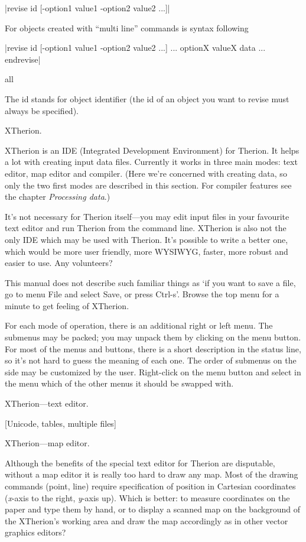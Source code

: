   |revise id [-option1 value1 -option2 value2 ...]|
  
  For objects created with ``multi line'' commands is syntax following

|revise id [-option1 value1 -option2 value2 ...]
  ...
  optionX valueX
  data
  ...
endrevise|
\endsyntax

\context
  all
\endcontext

\arguments
  The id stands for object identifier (the id of an object you want to
  revise must always be specified).
\endarguments




\subchapter XTherion.

XTherion is an IDE (Integrated Development Environment) for Therion. 
It helps a lot with creating input data files. Currently it works in 
three main modes: text editor, map editor and compiler. (Here we're concerned 
with creating data, so only the two first modes are described in this section. For compiler 
features see the chapter {\it Processing data}.)

It's not necessary for Therion itself---you may edit input files in your 
favourite text editor and run Therion from the command line. XTherion is also 
not the only IDE which may be used with Therion. It's possible to 
write a better one, which would be more user friendly, more WYSIWYG, faster, 
more robust and easier to use. Any volunteers?

This manual does not describe such familiar things as `if you want to save a file, go to 
menu File and select Save, or press Ctrl-s'. Browse the top menu for a minute 
to get feeling of XTherion. 

For each mode of operation, there is an additional 
right or left menu. The submenus may be packed; you may unpack them by 
clicking on the menu button. For most of the menus and buttons, there is a short 
description in the status line, so it's not hard to guess the meaning of each one.
The order of submenus on the side may be customized by the user. Right-click on 
the menu button and select in the menu which of the other menus it should 
be swapped with.


\subsubchapter XTherion---text editor.

[Unicode, tables, multiple files]

\subsubchapter XTherion---map editor.

Although the benefits of the special text editor for Therion are disputable, 
without a map editor it is really too hard to draw any map. Most of the drawing 
commands (point, line) require 
specification of position in Cartesian coordinates ({\it x\/}-axis to the right, 
{\it y\/}-axis up). Which is better: to measure coordinates on the paper and type
them by hand, or to display a scanned map on the background of the XTherion's 
working area and draw the map accordingly as in other vector graphics editors?

